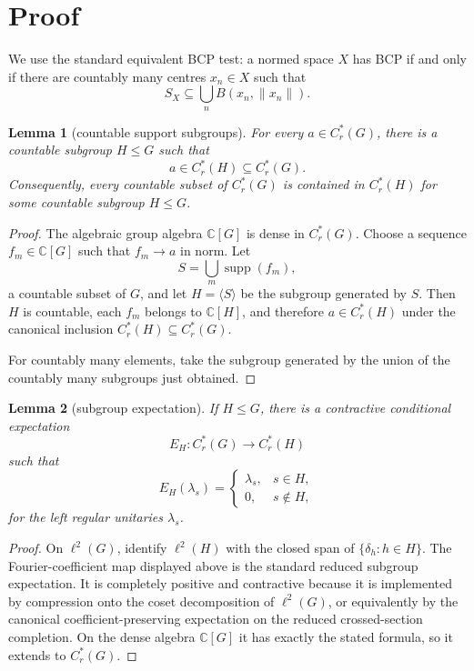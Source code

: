 \documentclass[11pt]{article}
\newtheorem{lemma}{Lemma}
\newcommand{\Cr}{C^*_r}
\begin{document}
\section*{Proof}

We use the standard equivalent BCP test: a normed space \(X\) has BCP if and
only if there are countably many centres \(x_n\in X\) such that
\[
        S_X\subseteq\bigcup_n B(x_n,\|x_n\|).
\]

\begin{lemma}[countable support subgroups]
\label{lem:countable-subgroup}
For every \(a\in\Cr(G)\), there is a countable subgroup \(H\le G\) such that
\[
        a\in \Cr(H)\subseteq\Cr(G).
\]
Consequently, every countable subset of \(\Cr(G)\) is contained in
\(\Cr(H)\) for some countable subgroup \(H\le G\).
\end{lemma}

\begin{proof}
The algebraic group algebra \(\mathbb C[G]\) is dense in \(\Cr(G)\).  Choose
a sequence \(f_m\in\mathbb C[G]\) such that \(f_m\to a\) in norm.  Let
\[
        S=\bigcup_m \operatorname{supp}(f_m),
\]
a countable subset of \(G\), and let \(H=\langle S\rangle\) be the subgroup
generated by \(S\).  Then \(H\) is countable, each \(f_m\) belongs to
\(\mathbb C[H]\), and therefore \(a\in\Cr(H)\) under the canonical inclusion
\(\Cr(H)\subseteq\Cr(G)\).

For countably many elements, take the subgroup generated by the union of the
countably many subgroups just obtained.
\end{proof}

\begin{lemma}[subgroup expectation]
\label{lem:expectation}
If \(H\le G\), there is a contractive conditional expectation
\[
        E_H:\Cr(G)\to\Cr(H)
\]
such that
\[
        E_H(\lambda_s)=
        \begin{cases}
        \lambda_s,&s\in H,\\
        0,&s\notin H,
        \end{cases}
\]
for the left regular unitaries \(\lambda_s\).
\end{lemma}

\begin{proof}
On \(\ell^2(G)\), identify \(\ell^2(H)\) with the closed span of
\(\{\delta_h:h\in H\}\).  The Fourier-coefficient map displayed above is the
standard reduced subgroup expectation.  It is completely positive and
contractive because it is implemented by compression onto the coset
decomposition of \(\ell^2(G)\), or equivalently by the canonical
coefficient-preserving expectation on the reduced crossed-section
completion.  On the dense algebra \(\mathbb C[G]\) it has exactly the stated
formula, so it extends to \(\Cr(G)\).
\end{proof}
\end{document}
